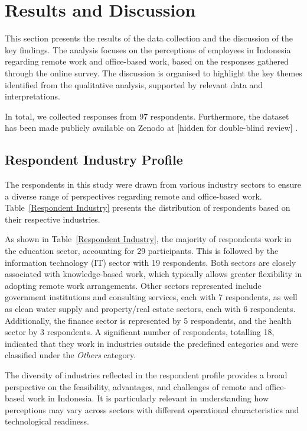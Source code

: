 \documentclass[a4paper, conference]{IEEEtran}
\begin{document}
\section{Results and Discussion}
\label{sec:results}

This section presents the results of the data collection and the discussion of the key findings. The analysis focuses on the perceptions of employees in Indonesia regarding remote work and office-based work, based on the responses gathered through the online survey. The discussion is organised to highlight the key themes identified from the qualitative analysis, supported by relevant data and interpretations.

In total, we collected responses from 97 respondents. Furthermore, the dataset has been made publicly available on Zenodo at 
[hidden for double-blind review]
.

\subsection{Respondent Industry Profile}
\label{sec:respondent-industry}

The respondents in this study were drawn from various industry sectors to ensure a diverse range of perspectives regarding remote and office-based work. Table~\ref{Respondent Industry} presents the distribution of respondents based on their respective industries.

As shown in Table~\ref{Respondent Industry}, the majority of respondents work in the education sector, accounting for 29 participants. This is followed by the information technology (IT) sector with 19 respondents. Both sectors are closely associated with knowledge-based work, which typically allows greater flexibility in adopting remote work arrangements. Other sectors represented include government institutions and consulting services, each with 7 respondents, as well as clean water supply and property/real estate sectors, each with 6 respondents. Additionally, the finance sector is represented by 5 respondents, and the health sector by 3 respondents. A significant number of respondents, totalling 18, indicated that they work in industries outside the predefined categories and were classified under the \textit{Others} category.

The diversity of industries reflected in the respondent profile provides a broad perspective on the feasibility, advantages, and challenges of remote and office-based work in Indonesia. It is particularly relevant in understanding how perceptions may vary across sectors with different operational characteristics and technological readiness.
\end{document}
